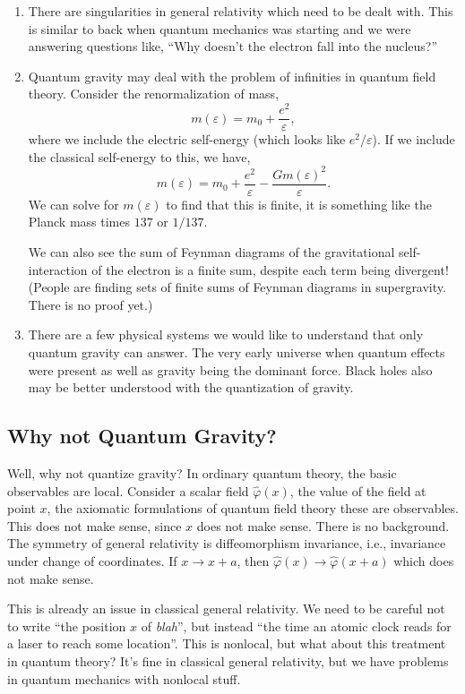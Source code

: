 \begin{enumerate}
\item There are singularities in general relativity which need to be
  dealt with. This is similar to back when quantum mechanics was
  starting and we were answering questions like, ``Why doesn't the
  electron fall into the nucleus?''

\item Quantum gravity may deal with the problem of infinities in quantum
  field theory. Consider the renormalization of mass,
\begin{equation}
m(\varepsilon) = m_{0} + \frac{e^{2}}{\varepsilon},
\end{equation}
where we include the electric self-energy (which looks like
$e^{2}/\varepsilon$). If we include the classical self-energy to this,
we have,
\begin{equation}
  m(\varepsilon)
  = m_{0} + \frac{e^{2}}{\varepsilon} - \frac{Gm(\varepsilon)^{2}}{\varepsilon}.
\end{equation}
We can solve for $m(\varepsilon)$ to find that this is finite, it is
something like the Planck mass times $137$ or $1/137$.

We can also see the sum of Feynman diagrams of the gravitational
self-interaction of the electron is a finite sum, despite each term
being divergent! (People are finding sets of finite sums of Feynman
diagrams in supergravity. There is no proof yet.)

\item There are a few physical systems we would like to understand that
  only quantum gravity can answer. The very early universe when quantum
  effects were present as well as gravity being the dominant
  force. Black holes also may be better understood with the quantization
  of gravity.
\end{enumerate}

\subsection{Why not Quantum Gravity?}

Well, why not quantize gravity? In ordinary quantum theory, the basic
observables are local.  Consider a scalar field $\widehat{\varphi}(x)$,
the value of the field at point $x$, the axiomatic formulations of
quantum field theory these are observables.  This does not make sense,
since $x$ does not make sense.  There is no background. The symmetry of
general relativity is diffeomorphism invariance, i.e., invariance under
change of coordinates.  If $x\to x+a$, then
$\widehat{\varphi}(x)\to\widehat{\varphi}(x+a)$ which does not make
sense.

This is already an issue in classical general relativity.  We need to be
careful not to write ``the position $x$ of \emph{blah}'', but instead
``the time an atomic clock reads for a laser to reach some location''.
This is nonlocal, but what about this treatment in quantum theory?  It's
fine in classical general relativity, but we have problems in quantum
mechanics with nonlocal stuff.